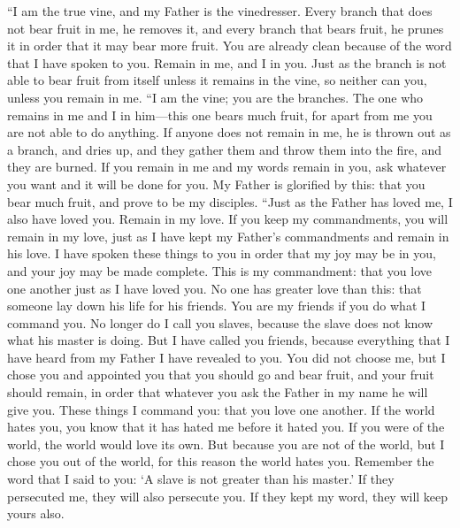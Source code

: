 \begin{biblechapter} %
 “I am the true vine, and my Father is the vinedresser.
\verse Every branch that does not bear fruit in me, he removes it, and every branch that bears fruit, he prunes it in order that it may bear more fruit.
\verse You are already clean because of the word that I have spoken to you.
\verse Remain in me, and I in you. Just as the branch is not able to bear fruit from itself unless it remains in the vine, so neither can you, unless you remain in me.
\verse “I am the vine; you are the branches. The one who remains in me and I in him—this one bears much fruit, for apart from me you are not able to do anything.
\verse If anyone does not remain in me, he is thrown out as a branch, and dries up, and they gather them and throw them into the fire, and they are burned.
\verse If you remain in me and my words remain in you, ask whatever you want and it will be done for you.
\verse My Father is glorified by this: that you bear much fruit, and prove to be my disciples.
\verse “Just as the Father has loved me, I also have loved you. Remain in my love.
\verse If you keep my commandments, you will remain in my love, just as I have kept my Father’s commandments and remain in his love.
\verse I have spoken these things to you in order that my joy may be in you, and your joy may be made complete.
\verse This is my commandment: that you love one another just as I have loved you.
\verse No one has greater love than this: that someone lay down his life for his friends.
\verse You are my friends if you do what I command you.
\verse No longer do I call you slaves, because the slave does not know what his master is doing. But I have called you friends, because everything that I have heard from my Father I have revealed to you.
\verse You did not choose me, but I chose you and appointed you that you should go and bear fruit, and your fruit should remain, in order that whatever you ask the Father in my name he will give you.
\verse These things I command you: that you love one another.
 If the world hates you, you know that it has hated me before it hated you.
\verse If you were of the world, the world would love its own. But because you are not of the world, but I chose you out of the world, for this reason the world hates you.
\verse Remember the word that I said to you: ‘A slave is not greater than his master.’ If they persecuted me, they will also persecute you. If they kept my word, they will keep yours also.

\end{biblechapter}
